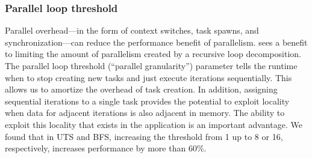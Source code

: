 {%





\subsubsection{Parallel loop threshold}


Parallel overhead---in the form of context switches, task spawns, and
synchronization---can reduce the performance benefit of parallelism.
\Grappa sees a benefit to limiting the amount of parallelism created by
a recursive loop decomposition. The parallel loop threshold (``parallel
granularity'') parameter tells the runtime when to stop creating new tasks and just execute iterations
sequentially. This allows us to amortize the overhead of task
creation. In addition, assigning sequential iterations to a single
task provides the potential to exploit locality when data for adjacent iterations is
also adjacent in memory. The ability to exploit this locality that
exists in the application is an important advantage. We found that in UTS and BFS, increasing the
threshold from 1 up to 8 or 16, respectively, increases performance by
more than 60\%.



}
